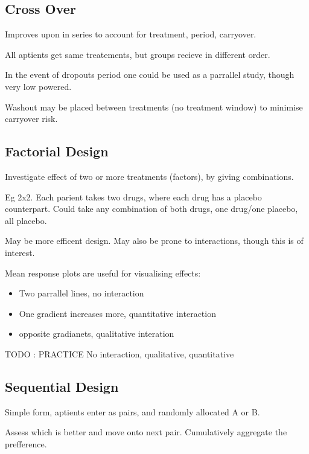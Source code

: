 \documentclass[
  letterpaper,
  DIV=11,
  numbers=noendperiod]{scrreprt}
\providecommand{\tightlist}{%
  \setlength{\itemsep}{0pt}\setlength{\parskip}{0pt}}\usepackage{longtable,booktabs,array}
\begin{document}
\hypertarget{cross-over}{%
\subsection{Cross Over}\label{cross-over}}

Improves upon in series to account for treatment, period, carryover.

All aptients get same treatements, but groups recieve in different
order.

In the event of dropouts period one could be used as a parrallel study,
though very low powered.

Washout may be placed between treatments (no treatment window) to
minimise carryover risk.

\hypertarget{factorial-design}{%
\subsection{Factorial Design}\label{factorial-design}}

Investigate effect of two or more treatments (factors), by giving
combinations.

Eg 2x2. Each parient takes two drugs, where each drug has a placebo
counterpart. Could take any combination of both drugs, one drug/one
placebo, all placebo.

May be more efficent design. May also be prone to interactions, though
this is of interest.

Mean response plots are useful for visualising effects:

\begin{itemize}
\tightlist
\item
  Two parrallel lines, no interaction
\item
  One gradient increases more, quantitative interaction
\item
  opposite gradianets, qualitative interation
\end{itemize}

TODO : PRACTICE No interaction, qualitative, quantitative

\hypertarget{sequential-design}{%
\subsection{Sequential Design}\label{sequential-design}}

Simple form, aptients enter as pairs, and randomly allocated A or B.

Assess which is better and move onto next pair. Cumulatively aggregate
the prefference.
\end{document}
